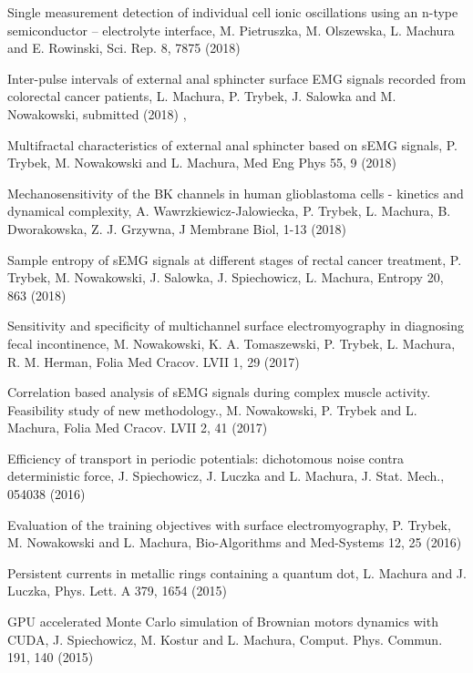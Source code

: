 \begin{etaremune}
\item Single measurement detection of individual cell ionic oscillations using an n-type semiconductor – electrolyte interface, M. Pietruszka, M. Olszewska, L. Machura and E. Rowinski, Sci. Rep. 8,  7875 (2018)

\item Inter-pulse intervals of external anal sphincter surface EMG signals recorded from colorectal cancer patients, L. Machura, P. Trybek, J. Salowka and M. Nowakowski, submitted (2018)
, 
\item Multifractal characteristics of external anal sphincter based on sEMG signals, P. Trybek, M. Nowakowski and L. Machura, Med Eng Phys 55,  9 (2018)

\item Mechanosensitivity of the BK channels in human glioblastoma cells - kinetics and dynamical complexity, A. Wawrzkiewicz-Jalowiecka, P. Trybek, L. Machura, B. Dworakowska, Z. J. Grzywna, J Membrane Biol,  1-13 (2018)

\item  Sample entropy of sEMG signals at different stages of rectal cancer treatment, P. Trybek, M. Nowakowski, J. Salowka, J. Spiechowicz, L. Machura, Entropy 20,  863 (2018)

\item Sensitivity and specificity of multichannel surface electromyography in diagnosing fecal incontinence, M. Nowakowski, K. A. Tomaszewski, P. Trybek, L. Machura, R. M. Herman, Folia Med Cracov. LVII 1,  29 (2017)

\item Correlation based analysis of sEMG signals during complex muscle activity. Feasibility study of new methodology., M. Nowakowski, P. Trybek and L. Machura, Folia Med Cracov. LVII 2,  41 (2017)

\item Efficiency of transport in periodic potentials: dichotomous noise contra deterministic force, J. Spiechowicz,  J. Luczka and L. Machura, J. Stat. Mech.,  054038 (2016)

\item Evaluation of the training objectives with surface electromyography, P. Trybek, M. Nowakowski and L. Machura, Bio-Algorithms and Med-Systems 12,  25 (2016)

\item Persistent currents in metallic rings containing a quantum dot, L. Machura and J. Luczka, Phys. Lett. A 379,  1654 (2015)

\item GPU accelerated Monte Carlo simulation of Brownian motors dynamics with CUDA, J. Spiechowicz, M. Kostur and L. Machura, Comput. Phys. Commun. 191,  140 (2015)


\end{etaremune}
